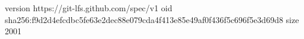 version https://git-lfs.github.com/spec/v1
oid sha256:f9d2d4efcdbc5fe63e2dec88e079cda4f413e85e49af0f436f5c696f5e3d69d8
size 2001
